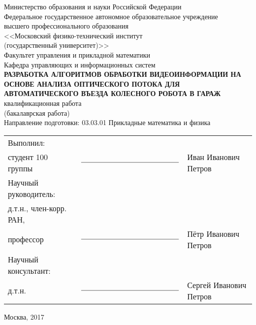 \begin{center} 

Министерство образования и науки Российской Федерации\\[0.5cm] 
Федеральное государственное автономное образовательное учреждение \\
высшего профессионального образования \\
<<Московский физико-технический институт \\
(государственный университет)>> \\[0.5cm]
Факультет управления и прикладной математики \\[0.5cm]
Кафедра управляющих и информационных систем \\[2.5cm]

\large \textbf{\MakeUppercase{Разработка алгоритмов обработки видеоинформации на основе анализа оптического потока для автоматического въезда колесного робота в гараж}}  \\[0.6cm] %
 квалификационная работа \\
(бакалаврская работа) \\[0.2cm]

Направление подготовки: 03.03.01 Прикладные математика и физика \\[1.5cm]


\end{center} 

\noindent
\begin{tabular}{lp{5cm}l}
Выполнил: & & \\
студент 100 группы & $\rule{5cm}{0.15mm}$ & Иван Иванович Петров \\[0.6cm]
Научный руководитель: & & \\
д.т.н., член-корр. РАН, & & \\
профессор & $\rule{5cm}{0.15mm}$ & Пётр Иванович Петров \\[0.6cm]
Научный консультант: & & \\
д.т.н. & $\rule{5cm}{0.15mm}$ & Сергей Иванович Петров \\
\end{tabular}


\vfill 

\begin{center} 
\large Москва, 2017
\end{center} 

\thispagestyle{empty}